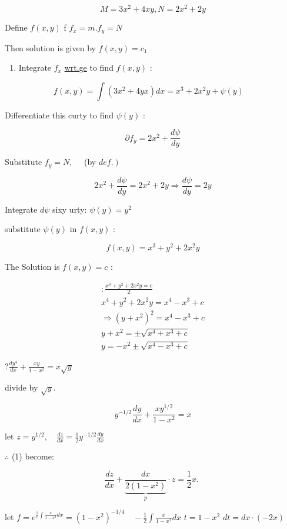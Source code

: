 \documentclass[12pt, a4paper]{article}
\begin{document}
$$
M=3 x^{2}+4 x y, N=2 x^{2}+2 y
$$

Define $f(x, y)$ f $f_{x}=m . f_{y}=N$

Then solution is given by $f(x, y)=c_{1}$

\begin{enumerate}
  \item Integrate $f_{x}$ \href{http://wrt.ge}{wrt.ge} to find $f(x, y)$ :
\end{enumerate}

$$
f(x, y)=\int\left(3 x^{2}+4 y x\right) d x=x^{3}+2 x^{2} y+\psi(y) \quad
$$

Differentiate this curty to find $\psi(y)$ :

$$
\partial f_{y}=2 x^{2}+\frac{d \psi}{d y}
$$

Substitute $f_{y}=N, \quad$ (by $\left.d e f.\right)$

$$
2 x^{2}+\frac{d \psi}{d y}=2 x^{2}+2 y \Rightarrow \frac{d \psi}{d y}=2 y
$$

Integrate $d \psi$ sixy urty: $\psi(y)=y^{2}$

substitute $\psi(y)$ in $f(x, y)$ :

$$
f(x, y)=x^{3}+y^{2}+2 x^{2} y
$$

The Solution is $f(x, y)=c$ :

$$
\begin{gathered}
: \frac{x^{3}+y^{2}+2 x^{2} y=c}{2} \\
x^{4}+y^{2}+2 x^{2} y=x^{4}-x^{3}+c \\
\Rightarrow\left(y+x^{2}\right)^{2}=x^{4}-x^{3}+c \\
y+x^{2}= \pm \sqrt{x^{4}+x^{3}+c} \\
y=-x^{2} \pm \sqrt{x^{4}-x^{3}+c}
\end{gathered}
$$


$? \frac{d y^{4}}{d x}+\frac{x y}{1-x^{2}}=x \sqrt{y}$

divide by $\sqrt{y}$.


\begin{equation*}
y^{-1 / 2} \frac{d y}{d x}+\frac{x y^{1 / 2}}{1-x^{2}}=x \tag{1}
\end{equation*}


let $z=y^{1 / 2}, \quad \frac{d z}{d x}=\frac{1}{2} y^{-1 / 2} \frac{d y}{d x}$

$\therefore$ (1) become:

$$
\frac{d z}{d x}+\underbrace{\frac{d x}{2\left(1-x^{2}\right)}}_{p} \cdot z=\frac{1}{2} x \text {. }
$$

let $f=e^{\frac{1}{e} \int \frac{x}{1-x^{2}} d x}=\left(1-x^{2}\right)^{-1 / 4} \quad-\frac{1}{2} \int \frac{x}{1-x^{2}} d x$ $t=1-x^{2}$ $d t=d x \cdot(-2 x)$
\end{document}
